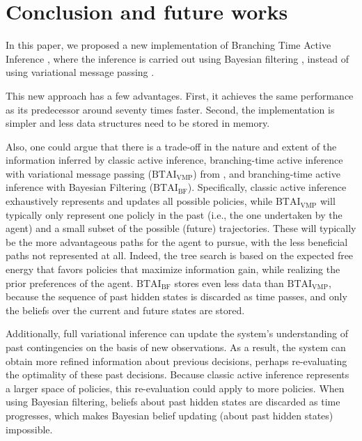 \documentclass[twoside,11pt]{article}
\begin{document}
\section{Conclusion and future works} \label{sec:conclusion}


In this paper, we proposed a new implementation of Branching Time Active Inference \citep{AITS_THEORY,AITS_PRACTICE}, where the inference is carried out using Bayesian filtering \citep{BAYESIAN_FILTERING}, instead of using variational message passing \citep{AI_VMP,VMP_TUTO}.

This new approach has a few advantages. First, it achieves the same performance as its predecessor around seventy times faster. Second, the implementation is simpler and less data structures need to be stored in memory.

Also, one could argue that there is a trade-off in the nature and extent of the information inferred by classic active inference, branching-time active inference with variational message passing ($\text{BTAI}_{\text{VMP}}$) from \citet{AITS_THEORY,AITS_PRACTICE}, and branching-time active inference with Bayesian Filtering ($\text{BTAI}_{\text{BF}}$). Specifically, classic active inference exhaustively represents and updates all possible policies, while $\text{BTAI}_{\text{VMP}}$ will typically only represent one policly in the past (i.e., the one undertaken by the agent) and a small subset of the possible (future) trajectories. These will typically be the more advantageous paths for the agent to pursue, with the less beneficial paths not represented at all. Indeed, the tree search is based on the expected free energy that favors policies that maximize information gain, while realizing the prior preferences of the agent. $\text{BTAI}_{\text{BF}}$ stores even less data than $\text{BTAI}_{\text{VMP}}$, because the sequence of past hidden states is discarded as time passes, and only the beliefs over the current and future states are stored.

Additionally, full variational inference can update the system's understanding of past contingencies on the basis of new observations. As a result, the system can obtain more refined information about previous decisions, perhaps re-evaluating the optimality of these past decisions. Because classic active inference represents a larger space of policies, this re-evaluation could apply to more policies. When using Bayesian filtering, beliefs about past hidden states are discarded as time progresses, which makes Bayesian belief updating (about past hidden states) impossible.
\end{document}
